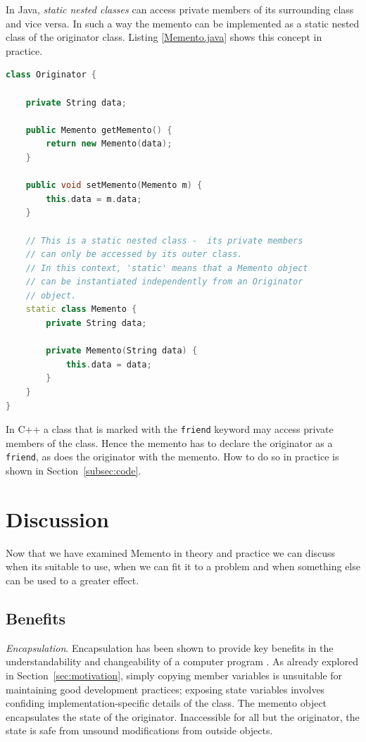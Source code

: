 \documentclass[11pt, a4paper, twoside]{article}
\begin{document}
	In Java, \emph{static nested classes} can access private members of its surrounding class and vice versa. In such a way the memento can be implemented as a static nested class of the originator class. Listing \ref{Memento.java} shows this concept in practice.
	
		\begin{lstlisting}[language=c++, caption={Memento.java}, label={Memento.java}]
class Originator {
	
	private String data;
	
	public Memento getMemento() {
		return new Memento(data);
	}
	
	public void setMemento(Memento m) {
		this.data = m.data;
	}
	
	// This is a static nested class -  its private members
	// can only be accessed by its outer class.
	// In this context, 'static' means that a Memento object
	// can be instantiated independently from an Originator
	// object.
	static class Memento {
		private String data;
	
		private Memento(String data) {
			this.data = data;
		}
	}
}
		\end{lstlisting}
	
	In C++ a class that is marked with the \verb|friend| keyword may access private members of the class. Hence the memento has to declare the originator as a \verb|friend|, as does the originator with the memento. How to do so in practice is shown in Section~\ref{subsec:code}.
	
	\section{Discussion}
	Now that we have examined Memento in theory and practice we can discuss when its suitable to use, when we can fit it to a problem and when something else can be used to a greater effect.
	
	
	\subsection{Benefits}
	\label{sec:benefits}
	\emph{Encapsulation}. Encapsulation has been shown to provide key benefits in the understandability and changeability of a computer program \cite{snyder1986}. As already explored in Section~\ref{sec:motivation}, simply copying member variables is unsuitable for maintaining good development practices; exposing state variables involves confiding implementation-specific details of the class. The memento object encapsulates the state of the originator. Inaccessible for all but the originator, the state is safe from unsound modifications from outside objects. \\
	
\end{document}
